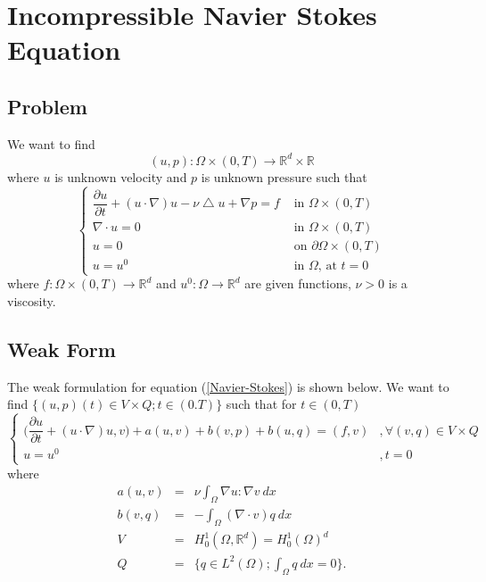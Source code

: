 \documentclass[a4paper,10pt]{article}
\newcommand{\R}{\mathbb{R}}
\begin{document}
\section{Incompressible Navier Stokes Equation}

\subsection{Problem}
We want to find \[(u,p) : \Omega \times (0,T) \rightarrow \R^d \times \R\] where $ u $ is unknown velocity and $ p $ is unknown pressure such that
\begin{equation}\label{Navier-Stokes}
\begin{cases}
\dfrac{\partial u}{\partial t} + (u \cdot \nabla) u - \nu \bigtriangleup u + \nabla p = f & \text{ in } \Omega \times (0,T)\\
\nabla \cdot u = 0 & \text{ in } \Omega \times (0,T)\\
u = 0 & \text{ on } \partial \Omega \times (0,T)\\
u = u^0 & \text{ in } \Omega \text{, at } t=0
\end{cases}
\end{equation}
where $ f : \Omega \times (0,T) \rightarrow \R^d $ and $ u^0 : \Omega \rightarrow \R^d $ are given functions, $ \nu > 0 $ is a viscosity.

\subsection{Weak Form}
The weak formulation for equation (\ref{Navier-Stokes}) is shown below. We want to find $ \{ (u,p)(t) \in V \times Q ; t \in (0.T) \} $ such that for $ t \in (0,T) $
\begin{equation} \label{NS_Weak}
\begin{cases}
\big( \dfrac{\partial u}{\partial t} + (u \cdot \nabla)u,v \big) + a(u,v) + b(v,p) + b(u,q) = (f,v) & ,\forall(v,q)\in V\times Q \\ u=u^{0} & , t=0
\end{cases}
\end{equation}
where
\begin{eqnarray}\nonumber
a(u,v) &=& \nu \int_{\Omega} \nabla u : \nabla v \ dx \\ \nonumber
b(v,q) &=& - \int_{\Omega} (\nabla \cdot v) q \ dx \\ \nonumber
V &=& H_{0}^{1}(\Omega, \R^d) = H_{0}^{1}(\Omega)^d \\ \nonumber
Q &=& \{ q\in L^2(\Omega) ; \int_{\Omega} q \ dx=0 \}.
\end{eqnarray}
\end{document}
